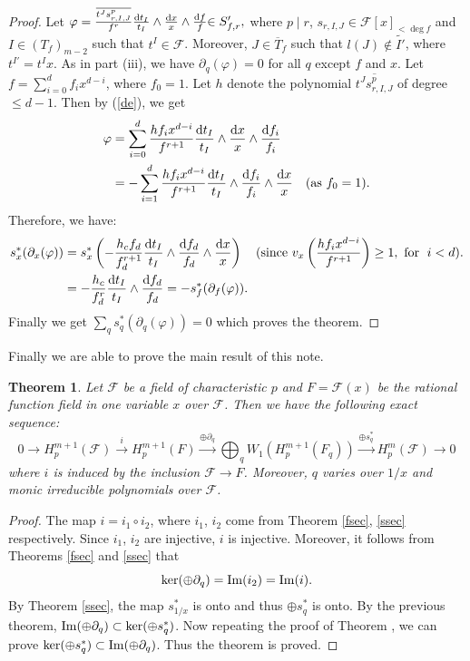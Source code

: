 \documentclass[times,10pt]{amsart}
\newcommand{\dd}{{\rm d}}
\newcommand{\F}{\ensuremath{\mathcal{F}}}
\renewcommand{\phi}{\varphi}
\newtheorem{thm}{Theorem}[section]
\begin{document}
\begin{proof}
             Let  $ {\phi={\frac{\overline{t^Js^p_{r,I,J}}}{f^r}\frac{\dd t_I}{t_I}\wedge \frac{\dd x}{x}\wedge \frac{\dd f}{f}}}\textcolor{black}{\in S'_{f,r}},$ where  $p\mid r$, $ s_{r,I,J}\in \F[x]_{< \deg f}$ and $I\in ({T}_f)_{m-2}$ such that $t^I\in \F$. Moreover, $J\in \overline{T}_f$ such that $l(J)\notin \tilde{I'}$, where $t^{I'}=t^Ix$.   As in part (iii),  we have  $\partial_q(\phi)=0$ for all $q$ except $f$ and $x$.  Let $f=\sum_{i=0}^{d} f_i x^{d-i}$, where $f_0=1$. Let $h$ denote the polynomial $ \overline{t^Js^p_{r,I,J}}$ of degree $\leq d-1$. Then by (\ref{de}), we get \begin{align*}
                \phi&= \sum_{i=0}^{d} { \frac{hf_ix^{d-i}}{f^{r+1}}\frac{\dd t_I}{t_I}\wedge \frac{\dd x}{x}\wedge \frac{\dd f_i}{f_i}}\\&= -\sum_{i=1}^{d} { \frac{hf_ix^{d-i}}{f^{r+1}}\frac{\dd t_I}{t_I}\wedge \frac{\dd f_i}{f_i}\wedge \frac{\dd x}{x}} \quad\textcolor{black}{(\text{as }  f_0=1)}.
            \end{align*}  Therefore, we have:  \begin{align*}
                 s_x^*(\partial_x(\phi))&=   s_x^*\left(-\frac{h_cf_d}{f_d^{r+1}}\frac{\dd t_I}{t_I}\wedge \frac{\dd f_d}{f_d}\wedge \frac{\dd x}{x}\right)\quad (\text{since  } v_x\left( \frac{hf_ix^{d-i}}{\textcolor{black}{f^{r+1}}}\right)\geq 1, \text{ for } \hspace{1mm} i<d ).\\&=  - \frac{h_c}{f_d^r}\frac{\dd t_I}{t_I}\wedge \frac{\dd f_d}{f_d}= -s_f^*(\partial_f(\phi)).
            \end{align*}  Finally we get   $\sum_qs_q^*(\partial_q(\phi))=0$ which proves the theorem. 
     \end{proof}
Finally we are able to  prove  the main result of this note.
     \begin{thm}\label{thml} Let $\F$ be a field of characteristic $p$   and $F=\F(x)$ be the rational function field in one variable $x$ over $\F$. Then we have the following exact sequence:
     $$  0\xrightarrow{} H_p^{m+1}(\F)\xrightarrow{i} H_p^{m+1}(F)\xrightarrow{\oplus \partial_q} \bigoplus_{q}W_1(H_p^{m+1}(F_q))\xrightarrow{\oplus s_q^*} H_p^m(\F)\xrightarrow{} 0 $$  where $ i$ is induced by the inclusion $\F\xrightarrow{} F$. Moreover, $q$  varies over  $1/x$ and monic irreducible polynomials over $\F$.
          \end{thm}

          \begin{proof}
               The map $i=i_1\circ i_2$, where $i_1$, $i_2$ come from Theorem \ref{fsec}, \ref{ssec} respectively. Since  $i_1$, $i_2$ are injective, $i$ is injective. Moreover, it follows from  Theorems \ref{fsec} and \ref{ssec} that $$\ker(\oplus \partial_q)= {\rm Im}(i_2)={\rm Im}(i).$$   By Theorem \ref{ssec}, the map $s^*_{1/x}$ is onto and thus $\oplus s_q^*$ is onto.    By the  previous theorem,  ${\rm Im}(\oplus \partial_q)\subset {\ker}(\oplus s_q^*)$. Now repeating the proof of Theorem \cite[Theorem 5.2]{Laghribi-Maiti},  we can prove  $ \ker (\oplus s_q^*)\subset {\rm Im} (\oplus \partial_q)$.   Thus the theorem is proved.
          \end{proof}
\end{document}
